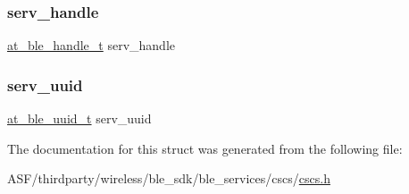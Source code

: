 \mbox{\label{structcsc__serv_aca01574e34f7351ca2e1fabdfa5b688a}} 
\subsubsection{\texorpdfstring{serv\_handle}{serv\_handle}}
{\footnotesize\ttfamily \mbox{\hyperlink{at__ble__api_8h_abd23646d0c662860741f787efc8456f2}{at\+\_\+ble\+\_\+handle\+\_\+t}} serv\+\_\+handle}

\mbox{\label{structcsc__serv_a4224f62d8329c28f97ce9e3a9e8782e8}} 
\subsubsection{\texorpdfstring{serv\_uuid}{serv\_uuid}}
{\footnotesize\ttfamily \mbox{\hyperlink{structat__ble__uuid__t}{at\+\_\+ble\+\_\+uuid\+\_\+t}} serv\+\_\+uuid}



The documentation for this struct was generated from the following file\+:\begin{DoxyCompactItemize}
\item 
A\+S\+F/thirdparty/wireless/ble\+\_\+sdk/ble\+\_\+services/cscs/\mbox{\hyperlink{cscs_8h}{cscs.\+h}}\end{DoxyCompactItemize}
